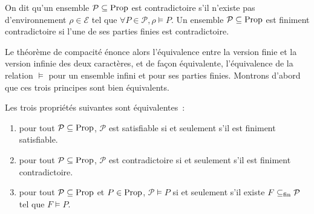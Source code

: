\begin{definition}[Contradiction]
  On dit qu'un ensemble $\mathcal P\subseteq\operatorname{Prop}$ est contradictoire s'il
  n'existe pas d'environnement $\rho\in\mathcal E$ tel que
  $\forall P \in\mathcal P, \rho\models P$. Un ensemble
  $\mathcal P\subseteq \operatorname{Prop}$ est finiment contradictoire si l'une de ses
  parties finies est contradictoire.
\end{definition}

Le théorème de compacité énonce alors l'équivalence entre la version finie et la
version infinie des deux caractères, et de façon équivalente, l'équivalence de
la relation $\vDash$ pour un ensemble infini et pour ses parties finies.
Montrons d'abord que ces trois principes sont bien équivalents.

\begin{proposition}
  Les trois propriétés suivantes sont équivalentes~:
  \begin{enumerate}[label=(\roman*)]
  \item\label{enum.compac.prop1} pour tout $\mathcal P\subseteq \operatorname{Prop}$,
    $\mathcal P$ est satisfiable si et seulement s'il est finiment satisfiable.
  \item\label{enum.compac.prop2} pour tout $\mathcal P\subseteq\operatorname{Prop}$,
    $\mathcal P$ est contradictoire si et seulement s'il est finiment
    contradictoire.
  \item\label{enum.compac.prop3} pour tout $\mathcal P\subseteq\operatorname{Prop}$ et
    $P\in\operatorname{Prop}$, $\mathcal P\vDash P$ si et seulement s'il existe
    $F\subseteq_{\mathrm{fin}} \mathcal P$ tel que $F\vDash P$.
  \end{enumerate}
\end{proposition}

